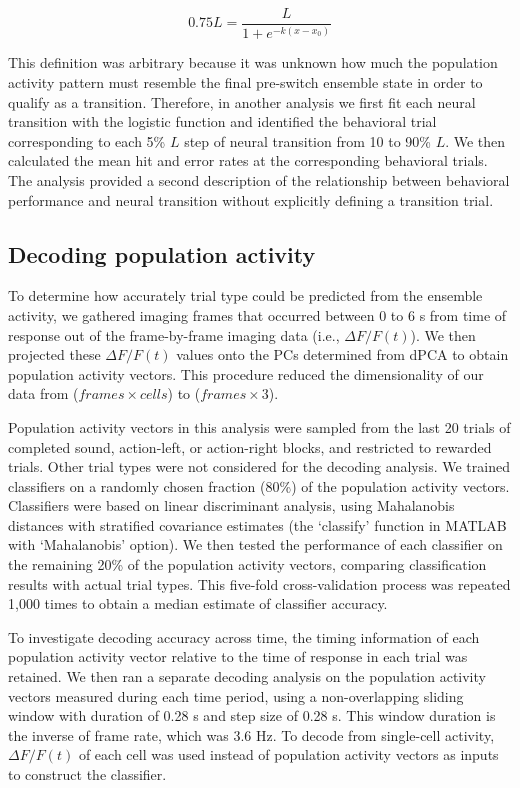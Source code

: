 \begin{equation*}
0.75L = \frac{L}{1+e^{-k(x-x_0)}}
\end{equation*}

This definition was arbitrary because it was unknown how much the population activity pattern must resemble the final pre-switch ensemble state in order to qualify as a transition. Therefore, in another analysis we first fit each neural transition with the logistic function and identified the behavioral trial corresponding to each 5\% $L$ step of neural transition from 10 to 90\% $L$. We then calculated the mean hit and error rates at the corresponding behavioral trials. The analysis provided a second description of the relationship between behavioral performance and neural transition without explicitly defining a transition trial.

\subsection*{Decoding population activity}
To determine how accurately trial type could be predicted from the ensemble activity, we gathered imaging frames that occurred between 0 to 6 s from time of response out of the frame-by-frame imaging data (i.e., $\Delta F/F (t)$). We then projected these $\Delta F/F (t)$ values onto the PCs determined from dPCA to obtain population activity vectors. This procedure reduced the dimensionality of our data from ($frames \times cells$) to ($frames \times 3$). 

Population activity vectors in this analysis were sampled from the last 20 trials of completed sound, action-left, or action-right blocks, and restricted to rewarded trials. Other trial types were not considered for the decoding analysis. We trained classifiers on a randomly chosen fraction (80\%) of the population activity vectors. Classifiers were based on linear discriminant analysis, using Mahalanobis distances with stratified covariance estimates (the `classify' function in MATLAB with `Mahalanobis' option). We then tested the performance of each classifier on the remaining 20\% of the population activity vectors, comparing classification results with actual trial types. This five-fold cross-validation process was repeated 1,000 times to obtain a median estimate of classifier accuracy. 

To investigate decoding accuracy across time, the timing information of each population activity vector relative to the time of response in each trial was retained. We then ran a separate decoding analysis on the population activity vectors measured during each time period, using a non-overlapping sliding window with duration of 0.28 s and step size of 0.28 s. This window duration is the inverse of frame rate, which was 3.6 Hz. To decode from single-cell activity, $\Delta F/F (t)$ of each cell was used instead of population activity vectors as inputs to construct the classifier.

